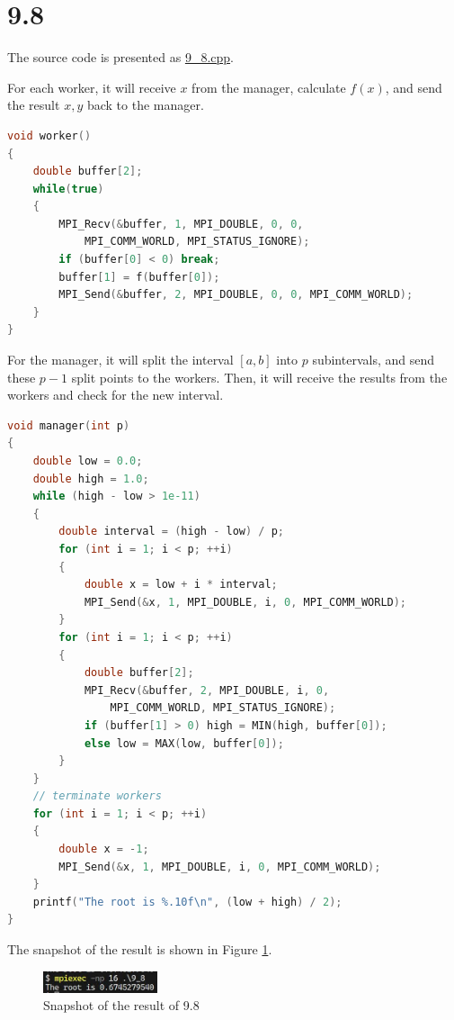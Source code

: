 \section*{9.8}

The source code is presented as \href{run:./9_8.cpp}{9\_8.cpp}.

For each worker, it will receive $x$ from the manager, calculate $f(x)$, and send the result $x,y$ back to the manager.

\begin{lstlisting}[language=C++]
void worker()
{
    double buffer[2];
    while(true)
    {
        MPI_Recv(&buffer, 1, MPI_DOUBLE, 0, 0, 
            MPI_COMM_WORLD, MPI_STATUS_IGNORE);
        if (buffer[0] < 0) break;
        buffer[1] = f(buffer[0]);
        MPI_Send(&buffer, 2, MPI_DOUBLE, 0, 0, MPI_COMM_WORLD);
    }
}
\end{lstlisting}

For the manager, it will split the interval $[a,b]$ into $p$ subintervals, and send these $p-1$ split points to the workers. Then, it will receive the results from the workers and check for the new interval.

\begin{lstlisting}[language=C++]
void manager(int p)
{
    double low = 0.0;
    double high = 1.0;
    while (high - low > 1e-11)
    {
        double interval = (high - low) / p;
        for (int i = 1; i < p; ++i)
        {
            double x = low + i * interval;
            MPI_Send(&x, 1, MPI_DOUBLE, i, 0, MPI_COMM_WORLD);
        }
        for (int i = 1; i < p; ++i)
        {
            double buffer[2];
            MPI_Recv(&buffer, 2, MPI_DOUBLE, i, 0,
                MPI_COMM_WORLD, MPI_STATUS_IGNORE);
            if (buffer[1] > 0) high = MIN(high, buffer[0]);
            else low = MAX(low, buffer[0]);
        }
    }
    // terminate workers
    for (int i = 1; i < p; ++i)
    {
        double x = -1;
        MPI_Send(&x, 1, MPI_DOUBLE, i, 0, MPI_COMM_WORLD);
    }
    printf("The root is %.10f\n", (low + high) / 2);
}
\end{lstlisting}

The snapshot of the result is shown in Figure \ref{fig:9_8}.

\begin{figure}[H]
    \centering
    \includegraphics[width=0.3\textwidth]{fig-9_8.jpg}
    \caption{Snapshot of the result of 9.8}
    \label{fig:9_8}
\end{figure}

